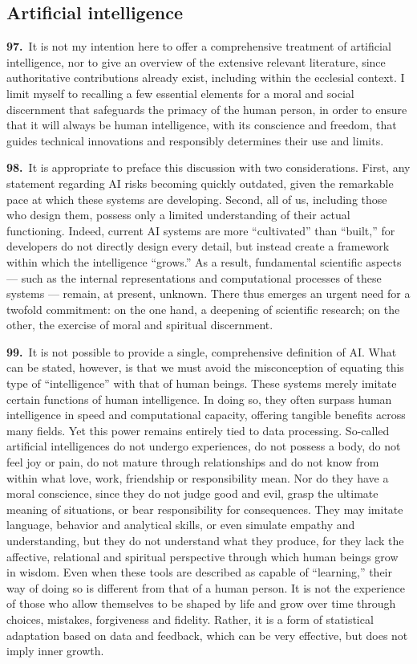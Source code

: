 \documentclass{article}
\begin{document}
\subsection{Artificial intelligence}

\textbf{97.}\ It is not my intention here to offer a comprehensive treatment of artificial intelligence, nor to give an overview of the extensive relevant literature, since authoritative contributions already exist, including within the ecclesial context.\cite{n123} I limit myself to recalling a few essential elements for a moral and social discernment that safeguards the primacy of the human person, in order to ensure that it will always be human intelligence, with its conscience and freedom, that guides technical innovations and responsibly determines their use and limits.

\textbf{98.}\ It is appropriate to preface this discussion with two considerations. First, any statement regarding AI risks becoming quickly outdated, given the remarkable pace at which these systems are developing. Second, all of us, including those who design them, possess only a limited understanding of their actual functioning. Indeed, current AI systems are more ``cultivated'' than ``built,'' for developers do not directly design every detail, but instead create a framework within which the intelligence ``grows.'' As a result, fundamental scientific aspects --- such as the internal representations and computational processes of these systems --- remain, at present, unknown. There thus emerges an urgent need for a twofold commitment: on the one hand, a deepening of scientific research; on the other, the exercise of moral and spiritual discernment.

\textbf{99.}\ It is not possible to provide a single, comprehensive definition of AI. What can be stated, however, is that we must avoid the misconception of equating this type of ``intelligence'' with that of human beings. These systems merely imitate certain functions of human intelligence. In doing so, they often surpass human intelligence in speed and computational capacity, offering tangible benefits across many fields. Yet this power remains entirely tied to data processing. So-called artificial intelligences do not undergo experiences, do not possess a body, do not feel joy or pain, do not mature through relationships and do not know from within what love, work, friendship or responsibility mean. Nor do they have a moral conscience, since they do not judge good and evil, grasp the ultimate meaning of situations, or bear responsibility for consequences. They may imitate language, behavior and analytical skills, or even simulate empathy and understanding, but they do not understand what they produce, for they lack the affective, relational and spiritual perspective through which human beings grow in wisdom. Even when these tools are described as capable of ``learning,'' their way of doing so is different from that of a human person. It is not the experience of those who allow themselves to be shaped by life and grow over time through choices, mistakes, forgiveness and fidelity. Rather, it is a form of statistical adaptation based on data and feedback, which can be very effective, but does not imply inner growth.
\end{document}
